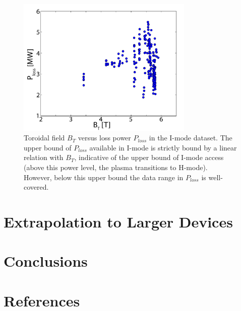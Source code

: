 \documentclass[12pt]{iopart}
\begin{document}
\begin{figure}[ht]
 \centering
 \includegraphics[width=0.75\textwidth]{Bt_Ploss.pdf}
 \caption{Toroidal field $B_T$ versus loss power $P_{loss}$ in the I-mode dataset.  The upper bound of $P_{loss}$ available in I-mode is strictly bound by a linear relation with $B_T$, indicative of the upper bound of I-mode access (above this power level, the plasma transitions to H-mode).  However, below this upper bound the data range in $P_{loss}$ is well-covered.}
 \label{fig:Bt_Ploss}
\end{figure}

\section{Extrapolation to Larger Devices}\label{sec:extrap}

\section{Conclusions}\label{sec:conclusion}

\section*{References}


\end{document}
